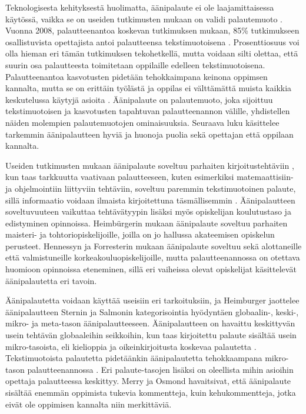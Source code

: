 \documentclass[utf8]{gradu3}
\begin{document}
Teknologisesta kehityksestä huolimatta, äänipalaute  ei ole laajamittaisessa käytössä, vaikka se on useiden tutkimusten mukaan on validi palautemuoto \parencite[][]{engaging}. Vuonna 2008, palautteenantoa koskevan tutkimuksen mukaan, 85\% tutkimukseen osallistuvista opettajista antoi palautteensa tekstimuotoisena \parencite[][]{electronic}. Prosenttiosuus voi olla hieman eri tämän tutkimuksen tekohetkellä, mutta voidaan silti olettaa, että suurin osa palautteesta toimitetaan oppilaille edelleen tekstimuotoisena. Palautteenantoa kasvotusten pidetään tehokkaimpana keinona oppimsen kannalta, mutta se on erittäin työlästä ja oppilas ei välttämättä muista kaikkia keskutelussa käytyjä asioita \parencite[][]{modes}. Äänipalaute on palautemuoto, joka sijoittuu tekstimuotoisen ja kasvotusten tapahtuvan palautteenannon välille, yhdistellen näiden molempien palautemuotojen ominaisuuksia. Seuraava luku käsittelee tarkemmin äänipalautteen hyviä ja huonoja puolia sekä opettajan että oppilaan kannalta.

Useiden tutkimusten mukaan äänipalaute soveltuu parhaiten kirjoitustehtäviin \parencite[][]{academics, engaging, using}, kun taas tarkkuutta vaativaan palautteeseen, kuten esimerkiksi matemaattisiin- ja ohjelmointiin liittyviin tehtäviin, soveltuu paremmin tekstimuotoinen palaute, sillä informaatio voidaan ilmaista kirjoitettuna täsmällisemmin \parencite[][]{academics}. Äänipalautteen soveltuvuuteen vaikuttaa tehtävätyypin lisäksi myös opiskelijan koulutustaso ja edistyminen opinnoissa. Heimbürgerin \parencite[][]{using} mukaan äänipalaute soveltuu parhaiten maisteri- ja tohtoriopiskelijoille, joilla on jo hallussa akateemisen opiskelun perusteet. Hennessyn ja Forresterin \parencite[][]{developing} mukaan äänipalaute soveltuu sekä alottaneille että valmistuneille korkeakouluopiskelijoille, mutta palautteenannossa on otettava huomioon opinnoissa eteneminen, sillä eri vaiheissa olevat opiskelijat käsittelevät äänipalautetta eri tavoin.

Äänipalautetta voidaan käyttää useisiin eri tarkoituksiin, ja Heimburger \parencite[][]{using} jaottelee äänipalautteen Sternin ja Salmonin \parencite[][]{stern} kategorisointia hyödyntäen globaalin-, keski-, mikro- ja meta-tason äänipalautteeseen. Äänipalautteen on havaittu keskittyvän usein tehtävän globaaleihin seikkoihin, kun taas kirjoitettu palaute sisältää usein mikro-tasoista, eli kielioppia ja oikeinkirjoitusta koskevaa palautetta \parencite[][]{versus}. Tekstimuotoista palautetta pidetäänkin äänipalautetta tehokkaampana mikro-tason palautteenannossa \parencite[][]{ice}. Eri palaute-tasojen lisäksi on oleellista mihin asioihin opettaja palautteessa keskittyy. Merry ja Osmond \parencite[][]{attitudes} havaitsivat, että äänipalaute sisältää enemmän oppimista tukevia kommentteja, kuin kehukommentteja, jotka eivät ole oppimisen kannalta niin merkittäviä.
\end{document}
